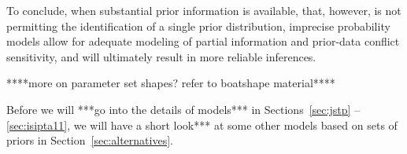 To conclude, when substantial prior information is available, that, however,
is not permitting the identification of a single prior distribution,
imprecise probability models allow for adequate modeling of partial information and prior-data conflict sensitivity,
and will ultimately result in more reliable inferences.

****more on parameter set shapes? refer to boatshape material****

\medskip

Before we will ***go into the details of models*** in Sections~\ref{sec:jstp} -- \ref{sec:isipta11},
we will have a short look*** at some other models based on sets of priors in Section~\ref{sec:alternatives}.







